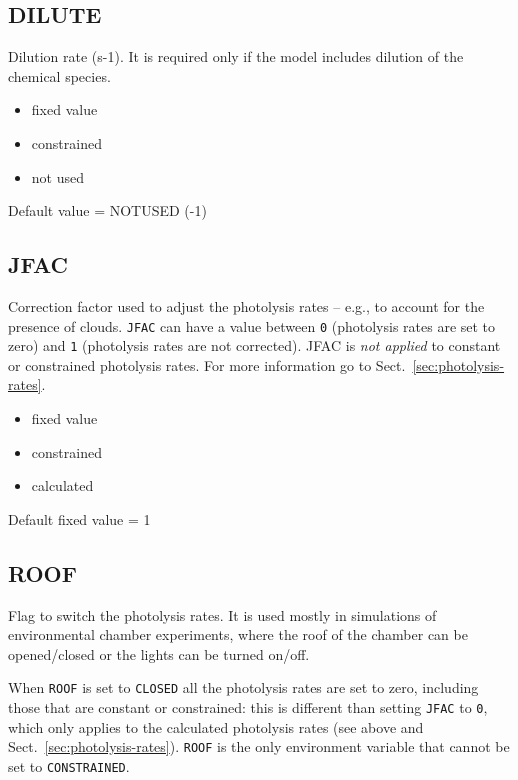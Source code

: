 \subsection{DILUTE} \label{subsec:dilute}

Dilution rate (s-1). It is required only if the model includes
dilution of the chemical species. %

\begin{itemize}
\item fixed value
\item constrained
\item not used
\end{itemize}

Default value = NOTUSED (-1)

\subsection{JFAC} \label{subsec:jfac}

Correction factor used to adjust the photolysis rates -- e.g., to
account for the presence of clouds. \texttt{JFAC} can have a value
between \texttt{0} (photolysis rates are set to zero) and \texttt{1}
(photolysis rates are not corrected). JFAC is \emph{not applied} to
constant or constrained photolysis rates. For more information go to
Sect.~\ref{sec:photolysis-rates}.

\begin{itemize}
\item fixed value
\item constrained
\item calculated
\end{itemize}

Default fixed value = 1

\subsection{ROOF} \label{subsec:roof}

Flag to switch the photolysis rates. It is used mostly in simulations
of environmental chamber experiments, where the roof of the chamber
can be opened/closed or the lights can be turned on/off.

When \texttt{ROOF} is set to \texttt{CLOSED} all the photolysis rates
are set to zero, including those that are constant or constrained:
this is different than setting \texttt{JFAC} to \texttt{0}, which only
applies to the calculated photolysis rates (see above and
Sect.~\ref{sec:photolysis-rates}). \texttt{ROOF} is the only
environment variable that cannot be set to \texttt{CONSTRAINED}.

